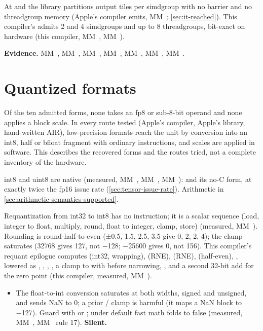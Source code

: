 At  and  the library partitions output tiles per simdgroup with no barrier and no
threadgroup memory (Apple's compiler emits, MM~; \cref{sec:it-reached}). This
compiler's  admits 2 and 4 simdgroups and up to 8 threadgroups, bit-exact on hardware (this compiler,
MM~, MM~).

\textbf{Evidence.} MM~, MM~, MM~, MM~, MM~, MM~, MM~.

\section{Quantized formats}\label{sec:quantized-formats}

Of the ten admitted forms, none takes an fp8 or sub-8-bit operand and none applies a block scale. In every route
tested (Apple's compiler, Apple's library, hand-written AIR), low-precision formats reach the unit by conversion into
an int8, half or bfloat fragment with ordinary instructions, and scales are applied in software. This describes the
recovered forms and the routes tried, not a complete inventory of the hardware.

int8 and uint8 are native (measured, MM~, MM~, MM~):  and its
no-C form, at exactly twice the fp16 issue rate (\cref{sec:tensor-issue-rate}). Arithmetic in \cref{sec:arithmetic-semantics-supported}.

Requantization from int32 to int8 has no instruction; it is a scalar sequence (load, integer to float, multiply,
round, float to integer, clamp, store) (measured, MM~). Rounding is round-half-to-even (±0.5, 1.5, 2.5, 3.5 give
0, 2, 2, 4); the clamp saturates (32768 gives 127, not −128; −25600 gives 0, not 156). This compiler's requant
epilogue computes  (int32, wrapping),  (RNE),  (RNE),
 (half-even), , lowered as , , , , a clamp to \code{[lo-zp, hi-zp]} with  before narrowing, , and a second 32-bit add for the zero point
(this compiler, measured, MM~).

\begin{itemize}
\item The float-to-int conversion saturates at both widths, signed and unsigned, and sends NaN to 0; a prior
  / clamp is harmful (it maps a NaN block to −127). Guard with  or
  ; under default fast math  folds to false (measured, MM~,
  MM~ rule 17). \textbf{Silent.}
\end{itemize}

